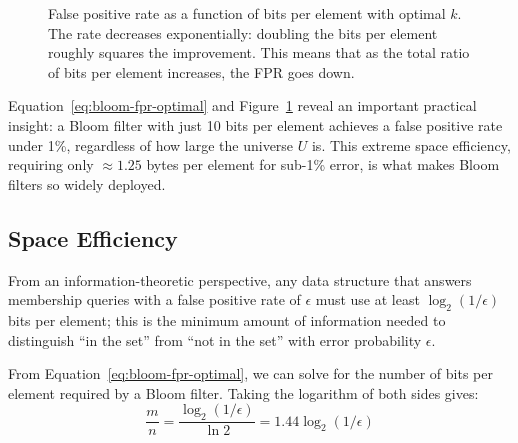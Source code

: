 \begin{figure}[H]
  \caption{False positive rate as a function of bits per element with 
           optimal $k$. The rate decreases exponentially: doubling the 
           bits per element roughly squares the improvement. This means that as the total ratio of bits per element increases, the FPR goes down.}
  \label{fig:bloom-fpr-curve}
\end{figure}

Equation~\ref{eq:bloom-fpr-optimal} and Figure~\ref{fig:bloom-fpr-curve} 
reveal an important practical insight: a Bloom filter with just 10 bits per 
element achieves a false positive rate under 1\%, regardless of how large 
the universe $U$ is. This extreme space efficiency, requiring only 
$\approx 1.25$ bytes per element for sub-1\% error, is what makes Bloom 
filters so widely deployed.

\subsection{Space Efficiency}

From an information-theoretic perspective, any data structure that answers 
membership queries with a false positive rate of $\epsilon$ must use at 
least $\log_2(1/\epsilon)$ bits per element; this is the minimum amount 
of information needed to distinguish ``in the set'' from ``not in the set'' 
with error probability $\epsilon$.

From Equation~\ref{eq:bloom-fpr-optimal}, we can solve for the number of 
bits per element required by a Bloom filter. Taking the logarithm of both 
sides gives:
\[
  \frac{m}{n} = \frac{\log_2(1/\epsilon)}{\ln 2} = 1.44 \log_2(1/\epsilon)
\]

